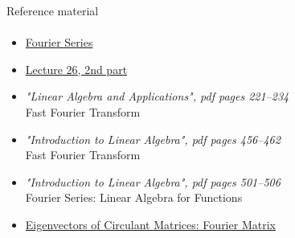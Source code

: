 \documentclass[aspectratio=169]{beamer}
\newcommand{\fbckg}[1]{\usebackgroundtemplate{\texttt{[image: \#1]}}}%
\begin{document}

\begin{frame}[t]{Reference material}
    \framesubtitle{}
    \vspace{-0.6cm}
    \Large
    \begin{itemize}
        \item \href{https://youtu.be/vA9dfINW4Rg}{Fourier Series}
        \item \href{https://www.youtube.com/watch?v=M0Sa8fLOajA&list=PL49CF3715CB9EF31D&index=27}{Lecture 26, 2nd part}
        \item \textit{"Linear Algebra and Applications", pdf pages 221--234 }\\ Fast Fourier Transform
        \item \textit{"Introduction to Linear Algebra", pdf pages 456--462 }\\ Fast Fourier Transform
        \item  \textit{"Introduction to Linear Algebra", pdf pages 501--506 }\\ Fourier Series:  Linear Algebra for Functions 
        \item \href{https://youtu.be/1pFv7e9xtHo}{Eigenvectors of Circulant Matrices: Fourier Matrix} \label{itm:circulant}
    \end{itemize}
\end{frame}

\fbckg{fibeamer/figs/last_page.png}
\frame[plain]{}
\end{document}
